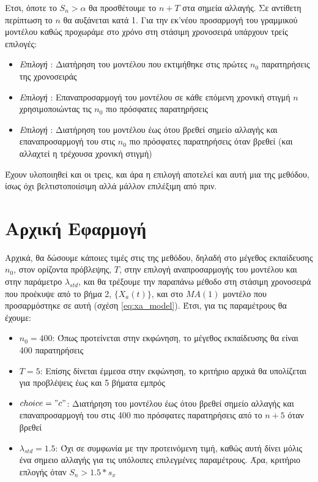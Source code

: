 \par Ετσι, όποτε το $S_n > \alpha$ θα προσθέτουμε το $n+T$ στα σημεία αλλαγής. Σε αντίθετη περίπτωση το $n$ θα αυξάνεται κατά 1. Για την εκ'νέου προσαρμογή του γραμμικού μοντέλου καθώς προχωράμε στο χρόνο στη στάσιμη χρονοσειρά υπάρχουν τρείς επιλογές:
\renewcommand{\labelitemi}{\textendash}
\begin{itemize}
    \item \textit{Επιλογή }: Διατήρηση του μοντέλου που εκτιμήθηκε στις πρώτες $n_0$ παρατηρήσεις της χρονοσειράς
    \item \textit{Επιλογή }: Επαναπροσαρμογή του μοντέλου σε κάθε επόμενη χρονική στιγμή $n$ χρησιμοποιώντας τις $n_0$ πιο πρόσφατες παρατηρήσεις
    \item \textit{Επιλογή }: Διατήρηση του μοντέλου έως ότου βρεθεί σημείο αλλαγής και επαναπροσαρμογή του στις $n_0$ πιο πρόσφατες παρατηρήσεις όταν βρεθεί (και αλλαχτεί η τρέχουσα χρονική στιγμή)
\end{itemize}

Έχουν υλοποιηθεί και οι τρεις, και άρα η επιλογή αποτελεί και αυτή μια  της μεθόδου, ίσως όχι βελτιστοποιίσιμη αλλά μάλλον επιλέξιμη από πριν.

\section{Αρχική Εφαρμογή}

Αρχικά, θα δώσουμε κάποιες τιμές στις  της μεθόδου, δηλαδή στο μέγεθος εκπαίδευσης $n_0$, στον ορίζοντα πρόβλεψης, $T$, στην επιλογή αναπροσαρμογής του μοντέλου και στην παράμετρο $\lambda_{std}$, και θα τρέξουμε την παραπάνω μέθοδο στη στάσιμη χρονοσειρά που προέκυψε από το βήμα 2, $\{X_a(t)\}$, και στο $MA(1)$ μοντέλο που προσαρμόστηκε σε αυτή (σχέση \ref{eq:xa_model}). Έτσι, για τις παραμέτρους θα έχουμε:
\renewcommand{\labelitemi}{\textendash}
\begin{itemize}
    \item $n_0=400$: Όπως προτείνεται στην εκφώνηση, το μέγεθος εκπαίδευσης θα είναι 400 παρατηρήσεις
    \item $T=5$: Επίσης δίνεται έμμεσα στην εκφώνηση, το κριτήριο αρχικά θα υπολίζεται για προβλέψεις έως και 5 βήματα εμπρός
    \item $choice="c"$: Διατήρηση του μοντέλου έως ότου βρεθεί σημείο αλλαγής και επαναπροσαρμογή του στις 400 πιο πρόσφατες παρατηρήσεις από το $n+5$ όταν βρεθεί
    \item $\lambda_{std}=1.5$: Όχι σε συμφωνία με την προτεινόμενη τιμή, καθώς αυτή δίνει μόλις ένα σημειο αλλαγής για τις υπόλοιπες επιλεγμένες παραμέτρους. Άρα, κριτήριο επλογής  όταν $S_n > 1.5 * s_x$
\end{itemize}

